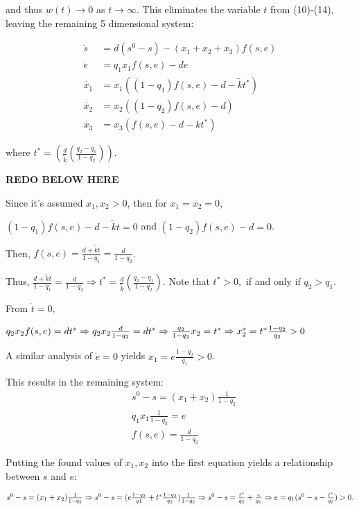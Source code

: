 \documentclass[12pt]{article}
\begin{document}
\noindent and thus $w(t)\rightarrow 0$ as $t\rightarrow \infty$. This eliminates the variable $t$ from (10)-(14), leaving the remaining 5 dimensional system: 

\begin{align}
\dot{s}&=d(s^0-s)-(x_1 + x_2+x_3) f(s,e)\\
\dot{e}&=q_1 x_1 f(s,e)-de\\
\dot{x_1} &= x_1((1-q_1)f(s,e)-d- \tilde{k}t^*)\\
\dot{x_2}&=x_2((1-q_2)f(s,e)-d)\\
\dot{x_3}&=x_3(f(s,e)-d-kt^*)
\end{align}

\noindent where $t^* = (\frac{d}{\tilde{k}}(\frac{q_2-q_1}{1-q_2}))$.

\textbf{REDO BELOW HERE}

\noindent Since it's assumed $x_1, x_2>0$, then for $\dot{x_1}=\dot{x_2}=0$, 

$(1-q_1)f(s,e)-d- \tilde{k}t=0$ and $(1-q_2)f(s,e)-d=0$. 

\noindent Then, $f(s,e)=\frac{d+\tilde{k}t}{1-q_1}=\frac{d}{1-q_2}$.

\noindent Thus, $\frac{d+\tilde{k}t}{1-q_1}=\frac{d}{1-q_2} \Rightarrow t^*=\frac{d}{\tilde{k}}(\frac{q_2-q_1}{1-q_2})$. Note that $t^*>0,$ if and only if $q_2 > q_1$. 

\noindent From $\dot{t}=0,$  

\noindent $q_2 x_2 f(s,e) = dt^* \\ 
\Rightarrow q_2 x_2 \frac{d}{1-q_2} =dt^* \\ 
\Rightarrow \frac{q_2}{1-q_2}x_2=t^* \\ 
\Rightarrow x_2^*=t^* \frac{1-q_2}{q_2} >0$

\noindent A similar analysis of $\dot{e}=0$ yields $x_1=e\frac{1-q_2}{q_1} >0$. 

\noindent This results in the remaining system: 
\begin{align}
&s^0-s=(x_1+x_2)\frac{1}{1-q_2}\\
&q_1 x_1 \frac{1}{1-q_2}= e\\
&f(s,e) = \frac{d}{1-q_2}
\end{align}

\noindent Putting the found values of $x_1, x_2$ into the first equation yields a relationship between $s$ and $e$:

\noindent $s^0-s=(x_1+x_2)\frac{1}{1-q_2} \\ 
\Rightarrow s^0-s=(e\frac{1-q_2}{q1}+ t^* \frac{1-q_2}{q_2})\frac{1}{1-q_2}\\ 
\Rightarrow s^0-s=\frac{t^*}{q_2}+\frac{e}{q_1} \\ 
\Rightarrow e = q_1(s^0-s-\frac{t^*}{q_2}) >0. $
\end{document}
